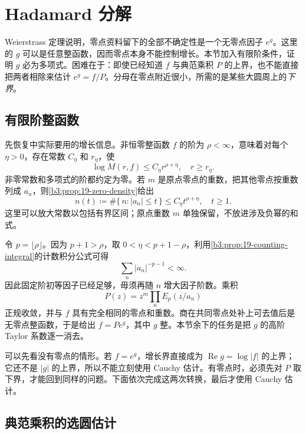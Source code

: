 \section{Hadamard 分解}
\label{b3:sec:2005}

Weierstrass 定理说明，零点资料留下的全部不确定性是一个无零点因子 \(e^g\)。这里的 \(g\) 可以是任意整函数，因而零点本身不能控制增长。本节加入有限阶条件，证明 \(g\) 必为多项式。困难在于：即使已经知道 \(f\) 与典范乘积 \(P\) 的上界，也不能直接把两者相除来估计 \(e^g=f/P\)。分母在零点附近很小，所需的是某些大圆周上的\emph{下界}。

\subsection{有限阶整函数}
\label{b3:subsec:200501}

先恢复中实际要用的增长信息。非恒零整函数 \(f\) 的阶为 \(\rho<\infty\)，意味着对每个 \(\eta>0\)，存在常数 \(C_\eta\) 和 \(r_\eta\)，使
\[
 \log M(r,f)\le C_\eta r^{\rho+\eta},\quad r\ge r_\eta.
\]
非零常数和多项式的阶都约定为零。若 \(m\) 是原点零点的重数，把其他零点按重数列成 \(a_n\)，则\cref{b3:prop:19-zero-density}给出
\[
 n(t)\coloneqq\#\{\,n:|a_n|\le t\,\}
 \le C_\eta t^{\rho+\eta},\quad t\ge1.
\]
这里可以放大常数以包括有界区间；原点重数 \(m\) 单独保留，不放进涉及负幂的和式。

\ProseParagraphBreak

令 \(p=\lfloor\rho\rfloor\)。因为 \(p+1>\rho\)，取 \(0<\eta<p+1-\rho\)，利用\cref{b3:prop:19-counting-integral}的计数积分公式可得
\[
 \sum_n|a_n|^{-p-1}<\infty.
\]
因此固定阶初等因子已经足够，毋须再随 \(n\) 增大因子阶数。乘积
\[
 P(z)=z^m\prod_n E_p(z/a_n)
\]
正规收敛，并与 \(f\) 具有完全相同的零点和重数。商在共同零点处补上可去值后是无零点整函数，于是给出 \(f=Pe^g\)，其中 \(g\) 整。本节余下的任务是把 \(g\) 的高阶 Taylor 系数逐一消去。

\ProseParagraphBreak

可以先看没有零点的情形。若 \(f=e^g\)，增长界直接成为 \(\operatorname{Re}g=\log|f|\) 的上界；它还不是 \(|g|\) 的上界，所以不能立刻使用 Cauchy 估计。有零点时，必须先对 \(P\) 取下界，才能回到同样的问题。下面依次完成这两次转换，最后才使用 Cauchy 估计。

\subsection{典范乘积的选圆估计}
\label{b3:subsec:200502}

